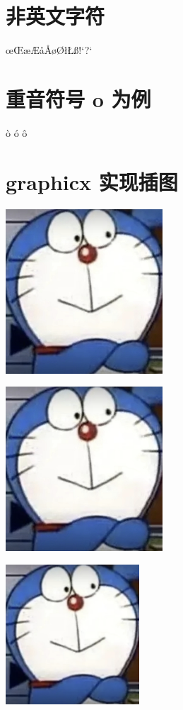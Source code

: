 \documentclass[8pt]{article}
\begin{document}
	
	\section{非英文字符}
	\oe \OE \ae \AE \aa \AA \o \O \l \L \ss \SS !`?`
	
	
	\section{重音符号 o 为例}
	\`o  \'o  \^o 
	
	\section{graphicx 实现插图}
	\graphicspath{{figures/}}
	
	
	
	\includegraphics{123.png}
	
	
	
	\includegraphics[scale=0.5]{123.png}
	
	\includegraphics[width=5cm]{123.png}
	
\end{document}
